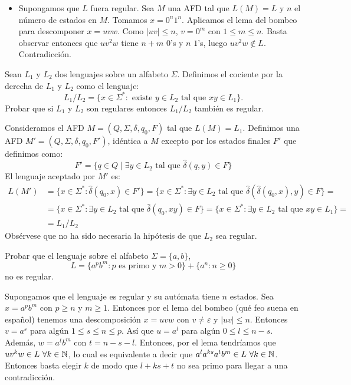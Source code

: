 \documentclass[twoside]{article}
\begin{document}
\begin{solucion}
\begin{itemize}
	\item Supongamos que $L$ fuera regular. Sea $M$ una AFD tal que $L(M)=L$ y $n$ el número de estados en $M$. Tomamos $x=0^n1^n$. Aplicamos el lema del bombeo para descomponer $x=uvw$. Como $|uv|≤n$, $v=0^m$ con $1≤m≤n$. Basta observar entonces que $uv^2w$ tiene $n+m$ $0$'s y $n$ $1$'s, luego $uv^2w \notin L$. Contradicción.
\end{itemize}
\end{solucion}

\newpage

\begin{ejercicio}{18}
Sean $L_1$ y $L_2$ dos lenguajes sobre un alfabeto $Σ$. Definimos el cociente por la derecha
de $L_1$ y $L_2$ como el lenguaje:
$$L_1/L_2 = \{x ∈ Σ^*
: \text{ existe } y ∈ L_2\text{ tal que }xy ∈ L_1\}.$$
Probar que si $L_1$ y $L_2$ son regulares entonces $L_1/L_2$ también es regular.
\end{ejercicio}
\begin{solucion}
Consideramos el AFD $M=(Q,Σ,δ,q_0,F)$ tal que $L(M)=L_1$. Definimos una AFD $M'=(Q,Σ,δ,q_0,F')$, idéntica a $M$ excepto por los estados finales $F'$ que definimos como:
\[ F' = \{q \in Q \mid \exists y \in L_2 \text{ tal que }\hat{δ}(q,y) \in F \}\]
El lenguaje aceptado por $M'$ es:
\begin{align*}
	L(M') & = \{x \in Σ^* : \hat{δ}(q_0,x) \in F'\} = \{x \in Σ^* : \exists y \in L_2 \text{ tal que } \hat{δ}(\hat{δ}(q_0,x),y) \in F\} =\\
	& = \{x \in Σ^* : \exists y \in L_2 \text{ tal que } \hat{δ}(q_0,xy) \in F\} = \{x \in Σ^* : \exists y \in L_2 \text{ tal que } xy \in L_1\}=\\
	& = L_1/L_2
\end{align*}
Obsérvese que no ha sido necesaria la hipótesis de que $L_2$ sea regular.
\end{solucion}

\newpage

\begin{ejercicio}{19}
Probar que el lenguaje sobre el alfabeto $Σ = \{a, b\}$,
$$L = \{a^pb^m : p \text{ es primo y }m > 0\} + \{a^n
: n ≥ 0\}$$
no es regular.
\end{ejercicio}
\begin{solucion}
Supongamos que el lenguaje es regular y su autómata tiene $n$ estados. Sea $x=a^pb^m$ con $p\geq n$ y $m\geq 1$. Entonces por el lema del bombeo (qué feo suena en español) tenemos una descomposición $x=uvw$ con $v\neq\varepsilon$ y $|uv|\leq n$. Entonces $v=a^s$ para algún $1\leq s\leq n\leq p$. Así que $u=a^l$ para algún $0\leq l\leq n-s$. Además, $w=a^tb^m$ con $t=n-s-l$. Entonces, por el lema tendríamos que $uv^kw\in L\ \forall k\in\mathbb{N}$, lo cual es equivalente a decir que $a^la^{ks}a^tb^m\in L\ \forall k\in\mathbb{N}$. Entonces basta elegir $k$ de modo que $l+ks+t$ no sea primo para llegar a una contradicción.
\end{solucion}
\end{document}
